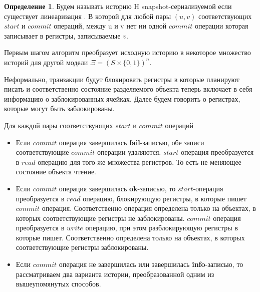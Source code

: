 \documentclass[pdftex,ptm,14pt,a4paper]{extreport}
\theoremstyle{definition}
\newtheorem{definition}{Определение}[chapter]
\begin{document}
\begin{definition}
    \label{snapshot-def}
    Будем называть историю H snapshot-сериализуемой если существует линеаризация \cite{linearizable}.
    В которой для любой пары $(u, v)$ соответствующих $start$ и $commit$ операций, между u и v нет ни одной
    $commit$ операции которая записывает в регистры, записываемые $v$.
\end{definition}

Первым шагом алгоритм преобразует исходную историю в некоторое множество историй для другой модели
$\Xi = (S\times\{0, 1\})^n.$

Неформально, транзакции будут блокировать регистры в которые планируют писать и соответственно
состояние разделяемого объекта теперь включает в себя информацию о заблокированных ячейках.
Далее будем говорить о регистрах, которые могут быть заблокированы.

Для каждой пары соответствующих $start$ и $commit$ операций
\begin{itemize}
    \item Если $commit$ операция завершилась \textbf{fail}-записью, обе записи
        соответствующие $commit$ операции удаляются.
        $start$ операция преобразуется в $read$ операцию для того-же множества регистров.
        То есть не меняющее состояние объекта чтение.
    \item Если $commit$ операция завершилась \textbf{ok}-записью, то
        $start$-операция преобразуется в $read$ операцию, блокирующую регистры,
        в которые пишет $commit$ операция. Соответственно операция определена только на объектах,
        в которых соответствующие регистры не заблокированы. $commit$ операция преобразуется в
        $write$ операцию, при этом разблокирующую регистры в которые пишет.
        Соответственно определена только на объектах, в которых соответствующие регистры заблокированы.
    \item Если $commit$ операция не завершилась или завершилась \textbf{info}-записью, то рассматриваем два варианта истории,
        преобразованной одним из вышеупомянутых способов.
\end{itemize}
\end{document}
